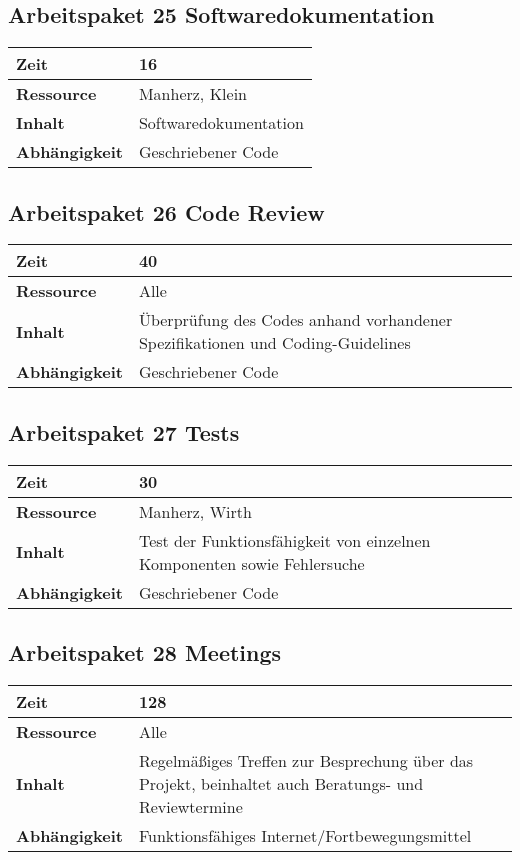 \documentclass[12pt,a4paper,onecolumn]{article}
\begin{document}
\subsection{Arbeitspaket 25 Softwaredokumentation}
\begin{tabularx}{\textwidth}{|l|X|}
\hline
     \textbf{Zeit} &  16\\
     \hline
     \textbf{Ressource} & Manherz, Klein\\
     \hline
     \textbf{Inhalt} &  Softwaredokumentation\\
     \hline
     \textbf{Abhängigkeit} & Geschriebener Code\\
\hline
\end{tabularx}
\subsection{Arbeitspaket 26 Code Review}
\begin{tabularx}{\textwidth}{|l|X|}
\hline
     \textbf{Zeit} & 40\\
     \hline
     \textbf{Ressource} & Alle\\
     \hline
     \textbf{Inhalt} &  Überprüfung des Codes anhand vorhandener Spezifikationen und Coding-Guidelines\\
     \hline
     \textbf{Abhängigkeit} & Geschriebener Code\\
\hline
\end{tabularx}
\subsection{Arbeitspaket 27 Tests}
\begin{tabularx}{\textwidth}{|l|X|}
\hline
     \textbf{Zeit} & 30\\
     \hline
     \textbf{Ressource} & Manherz, Wirth\\
     \hline
     \textbf{Inhalt} & Test der Funktionsfähigkeit von einzelnen Komponenten sowie Fehlersuche\\
     \hline
     \textbf{Abhängigkeit} & Geschriebener Code\\
\hline
\end{tabularx}
\subsection{Arbeitspaket 28 Meetings}
\begin{tabularx}{\textwidth}{|l|X|}
\hline
     \textbf{Zeit} & 128\\
     \hline
     \textbf{Ressource} & Alle\\
     \hline
     \textbf{Inhalt} & Regelmäßiges Treffen zur Besprechung über das Projekt, beinhaltet auch Beratungs- und Reviewtermine\\
     \hline
     \textbf{Abhängigkeit} & Funktionsfähiges Internet/Fortbewegungsmittel\\
\hline
\end{tabularx}
\end{document}
